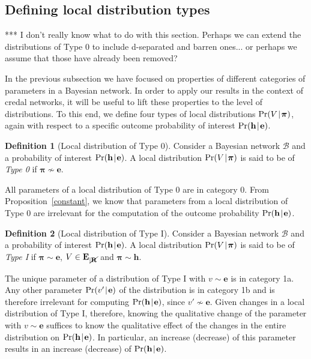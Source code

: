 \documentclass[10pt,a4paper]{paper}
\theoremstyle{definition}
\newtheorem{defi}{Definition}
\newcommand{\vbpi}{\boldsymbol\pi}
\newcommand{\hyp}{\mathbf{h}}
\newcommand{\ev}{\mathbf{e}}
\newcommand{\evs}{\mathbf{E}}
\newcommand{\restr}{_{|\cancel{\bf R}}}
\newcommand{\newmid}{\hspace{0.9pt}\vert\hspace{0.9pt}}
\begin{document}
\subsection{Defining local distribution types\label{sec:bayesian:distributiontypes}}
{\color{red}*** I don't really know what to do with this section. Perhaps we can extend the distributions of Type 0 to include d-separated and barren ones... or perhaps we assume that those have already been removed?}


In the previous subsection we have focused on properties of different categories of parameters in a Bayesian network. In order to apply our results in the context of credal networks, it will be useful to lift these properties to the level of distributions. To this end, 
we define four types of local distributions $\Pr(V\newmid\vbpi)$, again with respect to a specific outcome probability of interest $\Pr(\hyp\newmid\ev)$.

\begin{defi}[Local distribution of Type 0]\label{def:local:type0}
Consider a Bayesian network ${\mathcal B}$ and a probability of interest $\Pr(\hyp\newmid\ev)$.  A local distribution $\Pr(V\newmid \vbpi)$ is said to be of\, \emph{Type 0} if $\vbpi\nsim\ev$.
\end{defi}
All parameters of a local distribution of Type 0 are in category 0. From Proposition~\ref{constant}, we know that parameters from a local distribution of Type 0 are irrelevant for the computation of the outcome probability $\Pr(\hyp\newmid\ev)$. 

\begin{defi}[Local distribution of Type I]\label{def:local:type1}
Consider a Bayesian network ${\mathcal B}$ and a probability of interest $\Pr(\hyp\newmid\ev)$. A local distribution $\Pr(V\newmid \vbpi)$ is said to be of\, \emph{Type I} if\/ $\vbpi\sim\ev$, $V\in \evs\restr$ and $\vbpi\sim\hyp$.
\end{defi}
The unique parameter of a distribution of Type I with $v\sim\ev$ is in category 1a. Any other parameter $\Pr(v'\newmid\ev)$ of the distribution is in category 1b and is therefore irrelevant for computing $\Pr(\hyp\newmid\ev)$, since $v'\nsim\ev$.
Given changes in a local distribution of Type I, therefore, knowing the qualitative change of the parameter with $v\sim\ev$ suffices to know the qualitative effect of the changes in the entire distribution on $\Pr(\hyp\newmid\ev)$. In particular, an increase (decrease) of this parameter results in an increase (decrease) of $\Pr(\hyp\newmid\ev)$.
\end{document}
